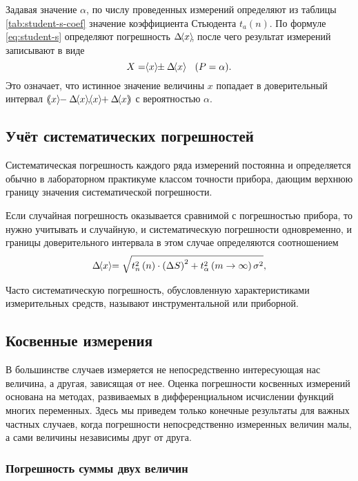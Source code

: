 \documentclass[a4paper, 12pt]{extarticle}
\begin{document}
Задавая значение $\alpha$, по числу проведенных измерений определяют
из таблицы \ref{tab:student-s-coef} значение коэффициента Стьюдента $t_a(n)$. По формуле
\eqref{eq:student-s} определяют погрешность $\Delta \hspace{-3pt}\left<x\right>\hspace{-3pt}$, после чего результат измерений
записывают в виде
\begin{equation}
    \label{eq:result-with-students}
    X = \hspace{-3pt}\left<x\right>\hspace{-3pt} \pm \Delta \hspace{-3pt}\left<x\right>\hspace{-3pt} \quad (P = \alpha).
\end{equation}
Это означает, что истинное значение величины $x$ попадает в доверительный интервал $\left(\MTDMean{x} - \Delta \MTDMean{x},  \MTDMean{x} + \Delta \MTDMean{x}\right)$ с вероятностью $\alpha$.

\subsection{Учёт систематических погрешностей}
Систематическая погрешность каждого ряда измерений постоянна и определяется обычно в лабораторном практикуме классом точности прибора, дающим верхнюю границу значения систематической погрешности.

Если случайная погрешность оказывается сравнимой с погрешностью прибора, то нужно учитывать и случайную, и систематическую погрешности одновременно, и границы доверительного интервала в этом случае определяются соотношением
\begin{equation}
    \label{eq:interval-with-systematic-error}
    \Delta \hspace{-3pt}\left<x\right>\hspace{-3pt} = \sqrt{t^2_n \left(n\right) \cdot \left(\Delta S\right)^2 + t^2_{\alpha} \left(m \to \infty\right)\sigma^2},
\end{equation}

Часто систематическую погрешность, обусловленную характеристиками измерительных средств, называют инструментальной или приборной.

\subsection{Косвенные измерения}

В большинстве случаев измеряется не непосредственно интересующая нас величина, а другая, зависящая от нее. Оценка погрешности косвенных измерений основана на методах, развиваемых в дифференциальном исчислении функций многих переменных. Здесь мы приведем только конечные результаты для важных частных случаев, когда погрешности непосредственно измеренных величин малы, а сами величины независимы друг от друга.


\subsubsection{Погрешность суммы двух величин}
\end{document}
